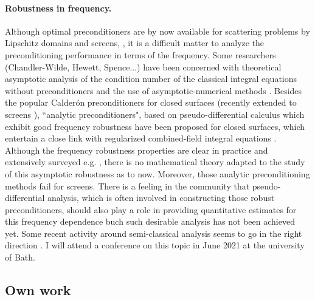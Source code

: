 \documentclass[]{article}
\begin{document}
\paragraph{Robustness in frequency.} Although optimal preconditioners are by now available for scattering problems by Lipschitz domains and screens, \cite{steinbach1998construction,hiptmair2006operator}, it is a difficult matter to analyze the preconditioning performance in terms of the frequency. Some researchers (Chandler-Wilde, Hewett, Spence...) have been concerned with theoretical asymptotic analysis of the condition number of the classical integral equations without preconditioners \cite{chandler2020high} and the use of asymptotic-numerical methods \cite{chandlerWilde2015high}. Besides the popular Calder\'{o}n preconditioners \cite{christiansen2000preconditionneurs,christiansen2002preconditioner} for closed surfaces (recently extended to screens \cite{bruno2012second}), ``analytic preconditioners", based on pseudo-differential calculus which exhibit good frequency robustness \cite{antoine2007generalized} have been proposed for closed surfaces, which entertain a close link with regularized combined-field integral equations \cite{buffa2005regularized}. Although the frequency robustness properties are clear in practice and extensively surveyed e.g. \cite{boubendir2014well}, there is no mathematical theory adapted to the study of this asymptotic robustness as to now. Moreover, those analytic preconditioning methods fail for screens. There is a feeling in the community that pseudo-differential analysis, which is often involved in constructing those robust preconditioners, should also play a role in providing quantitative estimates for this frequency dependence buch such desirable analysis has not been achieved yet. Some recent activity around semi-classical analysis seems to go in the right direction \cite{galkowski2019wavenumber}. I will attend a conference on this topic in June 2021 at the university of Bath. 


\subsection*{Own work}
\end{document}
